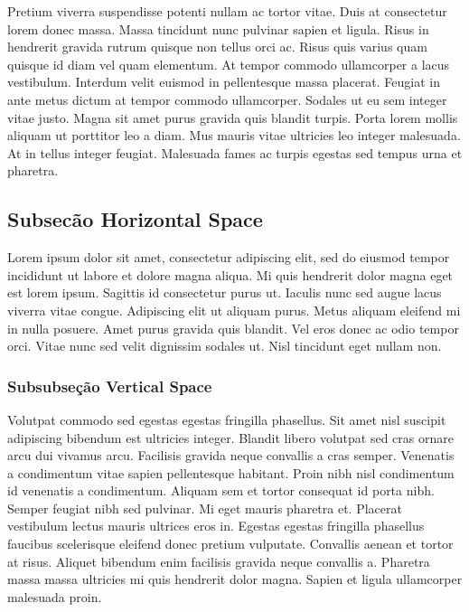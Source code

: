 \documentclass[12pt]{article}
\begin{document}
		\begin{spacing}{0.5} %
			Pretium viverra suspendisse potenti nullam ac tortor vitae. Duis at consectetur lorem donec massa. Massa tincidunt nunc pulvinar sapien et ligula. Risus in hendrerit gravida rutrum quisque non tellus orci ac. Risus quis varius quam quisque id diam vel quam elementum. At tempor commodo ullamcorper a lacus vestibulum. Interdum velit euismod in pellentesque massa placerat. Feugiat in ante metus dictum at tempor commodo ullamcorper. Sodales ut eu sem integer vitae justo. Magna sit amet purus gravida quis blandit turpis. Porta lorem mollis aliquam ut porttitor leo a diam. Mus mauris vitae ultricies leo integer malesuada. At in tellus integer feugiat. Malesuada fames ac turpis egestas sed tempus urna et pharetra.
		\end{spacing}
		
		\singlespacing %
	\subsection{Subsecão Horizontal Space}
		\hspace{0cm}Lorem ipsum dolor sit amet, consectetur adipiscing elit, sed do eiusmod tempor incididunt ut labore et dolore magna aliqua. Mi quis hendrerit dolor magna eget est lorem ipsum. %
		\hspace{1cm}Sagittis id consectetur purus ut. Iaculis nunc sed augue lacus viverra vitae congue. Adipiscing elit ut aliquam purus. Metus aliquam eleifend mi in nulla posuere. 
		\hspace{2cm}Amet purus gravida quis blandit. Vel eros donec ac odio tempor orci. Vitae nunc sed velit dignissim sodales ut. Nisl tincidunt eget nullam non.
		
	\subsubsection{Subsubseção Vertical Space}
		\vspace{1.5cm} %
		Volutpat commodo sed egestas egestas fringilla phasellus. Sit amet nisl suscipit adipiscing bibendum est ultricies integer. Blandit libero volutpat sed cras ornare arcu dui vivamus arcu. Facilisis gravida neque convallis a cras semper. Venenatis a condimentum vitae sapien pellentesque habitant. Proin nibh nisl condimentum id venenatis a condimentum. Aliquam sem et tortor consequat id porta nibh. Semper feugiat nibh sed pulvinar. Mi eget mauris pharetra et. \vspace{1cm}Placerat vestibulum lectus mauris ultrices eros in. Egestas egestas fringilla phasellus faucibus scelerisque eleifend donec pretium vulputate. Convallis aenean et tortor at risus. Aliquet bibendum enim facilisis gravida neque convallis a. Pharetra massa massa ultricies mi quis hendrerit dolor magna. Sapien et ligula ullamcorper malesuada proin.
	\newpage	
	
\end{document}
